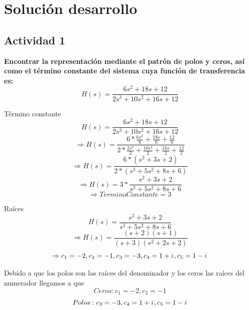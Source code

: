 \section{Solución desarrollo}
\subsection{Actividad 1}

\noindent\textbf{Encontrar la representación mediante el patrón de polos y ceros, así como el término constante del sistema cuya función de transferencia es:}
	\begin{equation}
		H(s)=\frac{6s^2+18s+12}{2s^3+10s^2+16s+12}
	\end{equation}
	\newline
	
	Término constante
	\begin{equation}
		H(s)=\frac{6s^2+18s+12}{2s^3+10s^2+16s+12}
	\end{equation}
	\begin{equation}
		\Rightarrow H(s)=\frac{6*\frac{6s^2}{6}+\frac{18s}{6}+\frac{12}{6}}{2*\frac{2s^3}{2}+\frac{10s^2}{2}+\frac{16s}{2}+\frac{12}{2}}
	\end{equation}
	\begin{equation}
		\Rightarrow H(s)=\frac{6*(s^2+3s+2)}{2*(s^3+5s^2+8s+6)}
	\end{equation}
	\begin{equation}
		\Rightarrow H(s)=3*\frac{s^2+3s+2}{s^3+5s^2+8s+6}
	\end{equation}	
	\begin{equation}
		\Rightarrow Termino Constante = 3
	\end{equation}
	
	Raíces
	\begin{equation}
		H(s)=\frac{s^2+3s+2}{s^3+5s^2+8s+6}
	\end{equation}	
	\begin{equation}
		\Rightarrow H(s)=\frac{(s+2)(s+1)}{(s+3)(s^2+2s+2)}
	\end{equation}		
	\begin{equation}
		\Rightarrow c_1=-2,c_2=-1,c_3=-3,c_4=1+{i\mkern1mu},c_5=1-{i\mkern1mu}
	\end{equation}		
	
	\noindent Debido a que los polos son las raíces del denominador y los ceros las raíces del numerador llegamos a que
	\begin{equation}
		Ceros: c_1=-2,c_2=-1 
	\end{equation}		
	\begin{equation}
		Polos: c_3=-3,c_4=1+{i\mkern1mu},c_5=1-{i\mkern1mu}
	\end{equation}

